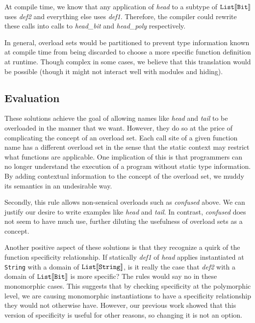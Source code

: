 \documentclass[preprint]{sigplanconf}
\newcommand{\ob}[1]{\ensuremath{\llbracket {#1} \rrbracket}}
\begin{document}
At compile time, we know that any application of {\it head} to a subtype of ${\tt List}\ob{{\tt Bit}}$ uses {\it def2} and
everything else uses {\it def1}.  Therefore, the compiler could rewrite these calls into calls to {\it head\_bit} and 
{\it head\_poly} respectively.  

In general, overload sets would be partitioned to prevent type information known
at compile time from being discarded to choose a more specific function definition at runtime.  Though complex
in some cases, we believe that this translation would be possible (though it might not interact well with modules
and hiding).

\subsection{Evaluation}

These solutions achieve the goal of allowing names like {\it head} and {\it tail} to be overloaded in the 
manner that we want.  However, they do so at the price of complicating the concept of an overload
set.  Each call site of a given function name has a different overload set in the sense that the static 
context may restrict what functions are applicable.  One implication of this is that programmers can
no longer understand the execution of a program without static type information.  By adding contextual
information to the concept of the overload set, we muddy its semantics in an undesirable way.

Secondly, this rule allows non-sensical overloads such as {\it confused} above.  We can justify our desire to
write examples like {\it head} and {\it tail}.  In contrast, {\it confused} does not seem to have much use, further
diluting the usefulness of overload sets as a concept.

Another positive aspect of these solutions is that they recognize a quirk of the function specificity relationship.  If statically
{\it def1} of {\it head} applies instantiated at {\tt String} with a domain of ${\tt List}\ob{{\tt String}}$, is it really 
the case that {\it def2} with a domain of ${\tt List}\ob{{\tt Bit}}$ is more specific?  The rules would say
no in these monomorphic cases. This suggests that by checking specificity at the polymorphic level,
we are causing monomorphic instantiations to have a specificity relationship they would not otherwise have.
However, our previous work showed that this version of specificity is useful for other reasons, so changing
it is not an option.  
\end{document}
